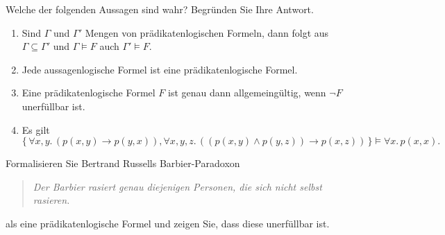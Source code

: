 \documentclass[german]{latteachCD}[2017/03/28]
\begin{document}
\begin{exercise}
  Welche der folgenden Aussagen sind wahr?  Begründen Sie Ihre Antwort.
  \begin{enumerate}
  \item Sind $\Gamma$ und $\Gamma'$ Mengen von prädikatenlogischen Formeln, dann
    folgt aus $\Gamma \subseteq \Gamma'$ und $\Gamma \models F$ auch $\Gamma'
    \models F$.
  \item Jede aussagenlogische Formel ist eine prädikatenlogische Formel.
  \item Eine prädikatenlogische Formel $F$ ist genau dann allgemeingültig,
    wenn $\lnot F$ unerfüllbar ist.
  \item Es gilt
    \begin{equation*}
      \{\,\forall x, y.\, (p(x,y) \to p(y,x)), \forall x, y, z.\, ((p(x,y) \land p(y,z))
      \to p(x,z))\,\} \models \forall x.\, p(x,x).
    \end{equation*}
  \end{enumerate}
\end{exercise}

\begin{exercise}
  Formalisieren Sie Bertrand Russells Barbier-Paradoxon
  \begin{quote}
    \emph{Der Barbier rasiert genau diejenigen Personen, die sich nicht selbst rasieren.}
  \end{quote}
  als eine prädikatenlogische Formel und zeigen Sie, dass diese unerfüllbar ist.
\end{exercise}
\end{document}
